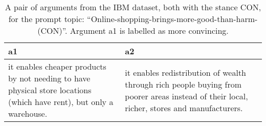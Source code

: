 \begin{table}
\centering
\caption{A pair of arguments from the IBM dataset, both with the stance CON, for the prompt topic: ``Online-shopping-brings-more-good-than-harm-(CON)''. Argument a1 is labelled as more convincing.}
\begin{tabular}{p{6cm}|p{6cm}}
\toprule
                                                                                                                   a1 &                                                                                                                                          a2 \\
\midrule
 it enables cheaper products by not needing to have physical store locations (which have rent), but only a warehouse. &  it enables redistribution of wealth through rich people buying from poorer areas instead of their local, richer, stores and manufacturers. \\
\bottomrule
\end{tabular}
\end{table}
